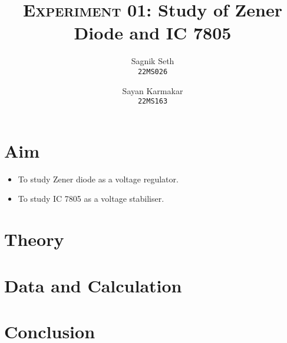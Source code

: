 \documentclass{scrartcl}
\title{
        \Large\textsc{Experiment 01: }
        \huge\textbf{Study of Zener Diode and IC 7805} \\
}
\author{{\Large Sagnik Seth} \\ \texttt{22MS026} \and {\Large Sayan Karmakar} \\ \texttt{22MS163}}
\date{}
\begin{document}
\maketitle
\section{Aim}
\begin{itemize}
        \item To study Zener diode as a voltage regulator.
        \item To study IC 7805 as a voltage stabiliser.
\end{itemize}
\section{Theory}
\section{Data and Calculation}
\section{Conclusion}
\end{document}
